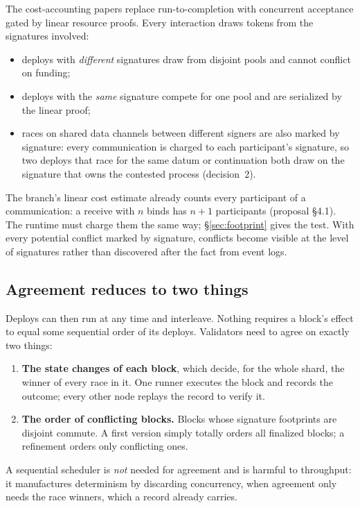 \documentclass[11pt]{article}
\begin{document}
The cost-accounting papers replace run-to-completion with concurrent acceptance gated by linear resource proofs. Every interaction draws tokens from the signatures involved:
\begin{itemize}
\item deploys with \emph{different} signatures draw from disjoint pools and cannot conflict on funding;
\item deploys with the \emph{same} signature compete for one pool and are serialized by the linear proof;
\item races on shared data channels between different signers are also marked by signature: every communication is charged to each participant's signature, so two deploys that race for the same datum or continuation both draw on the signature that owns the contested process (decision~2).
\end{itemize}
The branch's linear cost estimate already counts every participant of a communication: a receive with $n$ binds has $n+1$ participants (proposal \S4.1). The runtime must charge them the same way; \S\ref{sec:footprint} gives the test. With every potential conflict marked by signature, conflicts become visible at the level of signatures rather than discovered after the fact from event logs.

\subsection{Agreement reduces to two things}

Deploys can then run at any time and interleave. Nothing requires a block's effect to equal some sequential order of its deploys. Validators need to agree on exactly two things:
\begin{enumerate}
\item \textbf{The state changes of each block}, which decide, for the whole shard, the winner of every race in it. One runner executes the block and records the outcome; every other node replays the record to verify it.
\item \textbf{The order of conflicting blocks.} Blocks whose signature footprints are disjoint commute. A first version simply totally orders all finalized blocks; a refinement orders only conflicting ones.
\end{enumerate}
A sequential scheduler is \emph{not} needed for agreement and is harmful to throughput: it manufactures determinism by discarding concurrency, when agreement only needs the race winners, which a record already carries.
\end{document}
